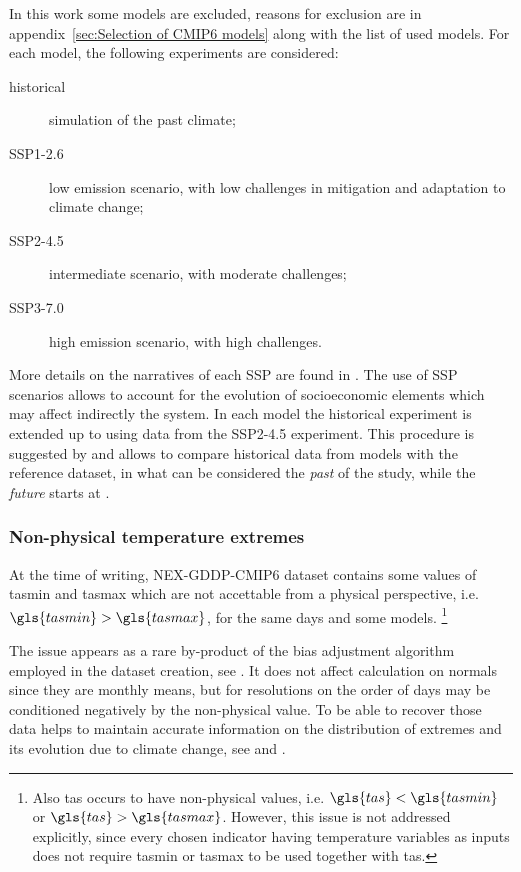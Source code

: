 In this work some models are excluded, reasons for exclusion are in appendix~\ref{sec:Selection of CMIP6 models} along with the list of used models. For each model, the following experiments are considered:
\begin{description}
  \item[historical] simulation of the past climate;
  \item[SSP1-2.6] low emission scenario, with low challenges in mitigation and adaptation to climate change;
  \item[SSP2-4.5] intermediate scenario, with moderate challenges;
  \item[SSP3-7.0] high emission scenario, with high challenges.
\end{description}
More details on the narratives of each \gls{SSP} are found in \cite{2017ONeillTheRoads}. The use of SSP scenarios allows to account for the evolution of socioeconomic elements which may affect indirectly the system.
In each model the historical experiment is extended up to  using data from the SSP2-4.5 experiment. This procedure is suggested by \cite[1954]{2016EyringOverviewOf} and allows to compare historical data from models with the reference dataset, in what can be considered the \emph{past} of the study, while the \emph{future} starts at .



\subsubsection{Non-physical temperature extremes}
\label{sec:Non-physical temperature extremes}
At the time of writing, NEX-GDDP-CMIP6 dataset contains some values of \glsdesc{tasmin} and \glsdesc{tasmax} which are not accettable from a physical perspective, i.e. $\gls{tasmin} > \gls{tasmax}$, for the same days and some models.%
\footnote{Also \glsdesc{tas} occurs to have non-physical values, i.e. $\gls{tas} < \gls{tasmin}$ or $\gls{tas} > \gls{tasmax}$. However, this issue is not addressed explicitly, since every chosen indicator having temperature variables as inputs does not require \gls{tasmin} or \gls{tasmax} to be used together with \gls{tas}.}

The issue appears as a rare by-product of the bias adjustment algorithm employed in the dataset creation, see \cite{2012ThrasherTechnicalNote}. It does not affect calculation on \glspl{normal} since they are monthly means, but for resolutions on the order of days may be conditioned negatively by the non-physical value. To be able to recover those data helps to maintain accurate information on the distribution of extremes and its evolution due to climate change, see \cite[1536-1537]{2021SeneviratneWeatherAnd} and \cite[40-42]{2012FieldManagingThe}.


